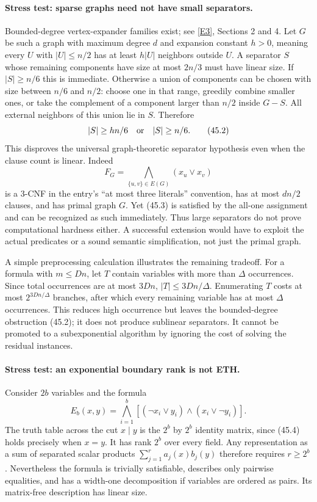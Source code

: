 \documentclass[11pt,a4paper]{article}
\newcommand{\eref}[2]{\hyperlink{extra:#1:#2}{[E#2]}}
\numberwithin{equation}{section}
\begin{document}
\paragraph{Stress test: sparse graphs need not have small separators.}
Bounded-degree vertex-expander families exist; see \eref{statement}{3}, Sections
2 and 4. Let $G$ be such a graph with maximum degree $d$ and expansion
constant $h>0$, meaning every $U$ with $|U|\le n/2$ has at least
$h|U|$ neighbors outside $U$. A separator $S$ whose remaining components
have size at most $2n/3$ must have linear size. If $|S|\ge n/6$ this is
immediate. Otherwise a union of components can be chosen with size
between $n/6$ and $n/2$: choose one in that range, greedily combine
smaller ones, or take the complement of a component larger than $n/2$
inside $G-S$. All external neighbors of this union lie in $S$.
Therefore
\[
 |S|\ge hn/6\quad\hbox{or}\quad |S|\ge n/6. \tag{45.2}
\]
This disproves the universal graph-theoretic separator hypothesis even
when the clause count is linear. Indeed
\[
 F_G=\bigwedge_{\{u,v\}\in E(G)}(x_u\lor x_v) \tag{45.3}
\]
is a $3$-CNF in the entry's ``at most three literals'' convention, has
at most $dn/2$ clauses, and has primal graph $G$. Yet (45.3) is
satisfied by the all-one assignment and can be recognized as such
immediately. Thus large separators do not prove computational hardness
either. A successful extension would have to exploit the actual
predicates or a sound semantic simplification, not just the primal graph.

A simple preprocessing calculation illustrates the remaining tradeoff.
For a formula with $m\le Dn$, let $T$ contain variables with more than
$\Delta$ occurrences. Since total occurrences are at most $3Dn$,
$|T|\le3Dn/\Delta$. Enumerating $T$ costs at most
$2^{3Dn/\Delta}$ branches, after which every remaining variable has at
most $\Delta$ occurrences. This reduces high occurrence but leaves the
bounded-degree obstruction (45.2); it does not produce sublinear
separators. It cannot be promoted to a subexponential algorithm by
ignoring the cost of solving the residual instances.

\paragraph{Stress test: an exponential boundary rank is not ETH.}
Consider $2b$ variables and the formula
\[
 E_b(x,y)=\bigwedge_{i=1}^b
    [(\neg x_i\lor y_i)\land(x_i\lor\neg y_i)]. \tag{45.4}
\]
The truth table across the cut $x\mid y$ is the $2^b$ by $2^b$
identity matrix, since (45.4) holds precisely when $x=y$. It has rank
$2^b$ over every field. Any representation as a sum of separated scalar
products $\sum_{j=1}^r a_j(x)b_j(y)$ therefore requires $r\ge2^b$.
Nevertheless the formula is trivially satisfiable, describes only
pairwise equalities, and has a width-one decomposition if variables are
ordered as pairs. Its matrix-free description has linear size.
\end{document}
